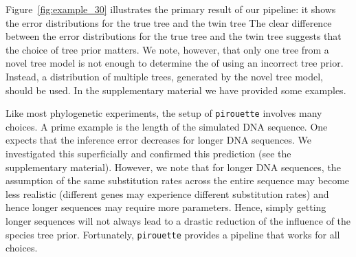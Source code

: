 Figure~\ref{fig:example_30} illustrates the primary result of our pipeline: 
it shows the error distributions for the true tree and the twin tree  
The clear difference between the error distributions 
for the true tree and the twin tree suggests 
that the choice of tree prior matters.
We note, however, that only one tree from a novel tree model
is not enough to determine the  of using an incorrect
tree prior. Instead, a distribution 
of multiple trees, generated by the novel tree model, should be used. In the supplementary material we have provided some examples.

Like most phylogenetic experiments, the setup of \verb;pirouette;
involves many choices. A prime example is the
length of the simulated DNA sequence. One expects that the inference error
decreases for longer DNA sequences. We investigated this
superficially and confirmed this prediction (see the supplementary material). 
However, we note that for longer DNA sequences, the assumption 
of the same substitution rates across the entire sequence may become less realistic (different genes may experience different substitution rates)
and hence longer sequences may require more parameters. 
Hence, simply getting longer sequences will not always lead to a drastic 
reduction of the influence of the species tree prior.
Fortunately, \verb;pirouette; provides a pipeline that works for all choices.

